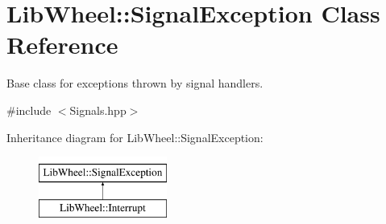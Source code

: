 \hypertarget{classLibWheel_1_1SignalException}{
\section{\-Lib\-Wheel\-:\-:\-Signal\-Exception \-Class \-Reference}
\label{classLibWheel_1_1SignalException}
}


\-Base class for exceptions thrown by signal handlers.  




{\ttfamily \#include $<$\-Signals.\-hpp$>$}

\-Inheritance diagram for \-Lib\-Wheel\-:\-:\-Signal\-Exception\-:\begin{figure}[H]
\begin{center}
\leavevmode
\includegraphics[height=2.000000cm]{classLibWheel_1_1SignalException}
\end{center}
\end{figure}
